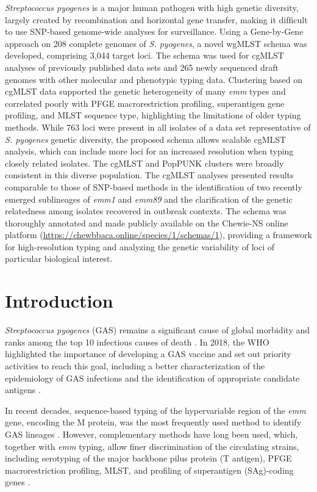 \textit{Streptococcus pyogenes} is a major human pathogen with high genetic diversity, largely created by recombination and horizontal gene transfer, making it difﬁcult to use \ac{SNP}-based genome-wide analyses for surveillance. Using a Gene-by-Gene approach on 208 complete genomes of \textit{S. pyogenes}, a novel \ac{wgMLST} schema was developed, comprising 3,044 target loci. The schema was used for \ac{cgMLST} analyses of previously published data sets and 265 newly sequenced draft genomes with other molecular and phenotypic typing data. Clustering based on \ac{cgMLST} data supported the genetic heterogeneity of many \textit{emm} types and correlated poorly with \ac{PFGE} macrorestriction proﬁling, superantigen gene proﬁling, and \ac{MLST} sequence type, highlighting the limitations of older typing methods. While 763 loci were present in all isolates of a data set representative of \textit{S. pyogenes} genetic diversity, the proposed schema allows scalable \ac{cgMLST} analysis, which can include more loci for an increased resolution when typing closely related isolates. The \ac{cgMLST} and PopPUNK clusters were broadly consistent in this diverse population. The \ac{cgMLST} analyses presented results comparable to those of \ac{SNP}-based methods in the identiﬁcation of two recently emerged sublineages of \textit{emm1} and \textit{emm89} and the clariﬁcation of the genetic relatedness among isolates recovered in outbreak contexts. The schema was thoroughly annotated and made publicly available on the \ac{Chewie-NS} online platform (\url{https://chewbbaca.online/species/1/schemas/1}), providing a framework for high-resolution typing and analyzing the genetic variability of loci of particular biological interest.

\section{Introduction} \label{sec:ch4_introduction}

\textit{Streptococcus pyogenes} (\ac{GAS}) remains a signiﬁcant cause of global morbidity and ranks among the top 10 infectious causes of death \cite{carapetis_global_2005}. In 2018, the \ac{WHO} highlighted the importance of developing a \ac{GAS} vaccine and set out priority activities to reach this goal, including a better characterization of the epidemiology of \ac{GAS} infections and the identiﬁcation of appropriate candidate antigens \cite{vekemans_path_2019}.

In recent decades, sequence-based typing of the hypervariable region of the \textit{emm} gene, encoding the M protein, was the most frequently used method to identify \ac{GAS} lineages \cite{beall_sequencing_1996}. However, complementary methods have long been used, which, together with \textit{emm} typing, allow ﬁner discrimination of the circulating strains, including serotyping of the major backbone pilus protein (T antigen), \ac{PFGE} macrorestriction proﬁling, \ac{MLST}, and proﬁling of superantigen (SAg)-coding genes \cite{carrico_illustration_2006, friaes_superantigen_2013, enright_multilocus_2001}.

